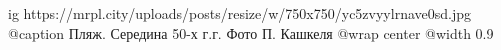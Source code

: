  
 
 
 
 

\ifcmt
  ig https://mrpl.city/uploads/posts/resize/w/750x750/yc5zvyylrnave0sd.jpg
	@caption Пляж. Середина 50-х г.г. Фото П. Кашкеля
  @wrap center
  @width 0.9
\fi
